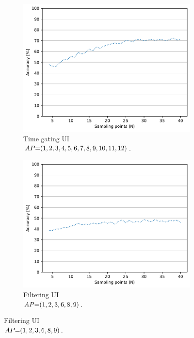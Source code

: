 \begin{figure}[!t]
    \begin{subfigure}{.49\textwidth}
        \centering
        \includegraphics[width=.99\linewidth]{Figures/RadarExperiments/Datasets/ThroughMaterials/Wood/samples-timegating-ui.pdf}
        \vspace{-5pt}
        \captionsetup{width=.99\linewidth}
        \caption{Time gating UI \\ $\splitatcommas{AP{=}(1, 2, 3, 4, 5, 6, 7, 8, 9, 10, 11, 12)}$.}
        \label{fig:radar-experiments:through-materials:wood-samples:timegating-ui}
    \end{subfigure}
    \begin{subfigure}{.49\textwidth}
        \centering
        \includegraphics[width=.99\linewidth]{Figures/RadarExperiments/Datasets/ThroughMaterials/Wood/samples-filtering-ui.pdf}  
        \vspace{-5pt}
        \captionsetup{width=.99\linewidth}
        \caption{Filtering UI \\ $\splitatcommas{AP{=}(1, 2, 3, 6, 8, 9)}$.}
        \label{fig:radar-experiments:through-materials:wood-samples:filtering-ui}
    \end{subfigure}
  

\end{figure}
